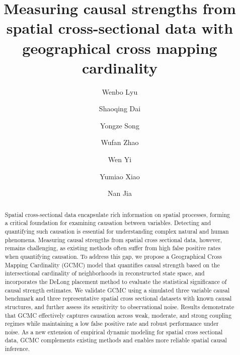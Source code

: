 \documentclass[authoryear,preprint,review,12pt]{elsarticle}
\begin{document}
\begin{frontmatter}
\title{Measuring causal strengths from spatial cross-sectional data with geographical cross mapping cardinality}

\author[a,b,c]{Wenbo Lyu}

\author[d]{Shaoqing Dai}

\author[e]{Yongze Song}

\author[a]{Wufan Zhao}

\author[b]{Wen Yi}

\author[a]{Yumiao Xiao}

\author[f,g]{Nan Jia}


\address[a]{Urban Governance and Design Thrust, The Hong Kong University of Science and Technology (Guangzhou), Guangzhou, China}
\address[b]{Department of Building and Real Estate, The Hong Kong Polytechnic University, Hong Kong, China}
\address[c]{Shenzhen Research Institute, The Hong Kong Polytechnic University, Shenzhen, China}
\address[d]{School of Resource and Environmental Sciences, Wuhan University, Wuhan, China}
\address[e]{School of Design and the Built Environment, Curtin University, Perth, Australia}
\address[f]{College of Public Administration, Nanjing Agricultural University, Nanjing, China}
\address[g]{Department of Fisheries and Wildlife, Michigan State University, East Lansing, United States}

\begin{abstract}

Spatial cross-sectional data encapsulate rich information on spatial processes, forming a critical foundation for examining causation between variables. Detecting and quantifying such causation is essential for understanding complex natural and human phenomena. Measuring causal strengths from spatial cross sectional data, however, remains challenging, as existing methods often suffer from high false positive rates when quantifying causation. To address this gap, we propose a Geographical Cross Mapping Cardinality (GCMC) model that quantifies causal strength based on the intersectional cardinality of neighborhoods in reconstructed state space, and incorporates the DeLong placement method to evaluate the statistical significance of causal strength estimates. We validate GCMC using a simulated three variable causal benchmark and three representative spatial cross sectional datasets with known causal structures, and further assess its sensitivity to observational noise. Results demonstrate that GCMC effectively captures causation across weak, moderate, and strong coupling regimes while maintaining a low false positive rate and robust performance under noise. As a new extension of empirical dynamic modeling for spatial cross sectional data, GCMC complements existing methods and enables more reliable spatial causal inference.


\end{abstract}
\end{frontmatter}
\end{document}
